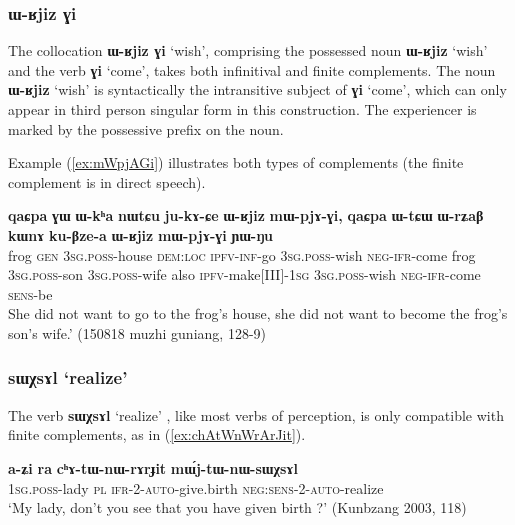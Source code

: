 \documentclass[oneside,a4paper,11pt]{article}
\newcommand{\ipa}[1]{\textbf{\phon#1}} %
\newcommand{\jpg}[2]{\ipa{#1} `#2'} %
\newcommand{\refb}[1]{(\ref{#1})}
\begin{document}
\subsubsection{\ipa{ɯ-ʁjiz ɣi}}
The collocation \jpg{ɯ-ʁjiz ɣi}{wish}, comprising the possessed noun \jpg{ɯ-ʁjiz}{wish} and the verb \jpg{ɣi}{come}, takes both infinitival and finite complements. The noun \jpg{ɯ-ʁjiz}{wish} is syntactically the intransitive subject of \jpg{ɣi}{come}, which can only appear in third person singular form in this construction. The experiencer is marked by the possessive prefix on the noun.

Example \refb{ex:mWpjAGi} illustrates both types of complements (the finite complement is in direct speech).
\begin{exe}
\ex \label{ex:mWpjAGi}
\gll 
\ipa{qaɕpa} 	\ipa{ɣɯ} 	\ipa{ɯ-kʰa} 	\ipa{nɯtɕu} 	\ipa{ju-kɤ-ɕe} 	\ipa{ɯ-ʁjiz} 	\ipa{mɯ-pjɤ-ɣi,} 	\ipa{qaɕpa} 	\ipa{ɯ-tɕɯ} 	\ipa{ɯ-rʑaβ} 	\ipa{kɯnɤ} 	\ipa{ku-βze-a} 	\ipa{ɯ-ʁjiz} 	\ipa{mɯ-pjɤ-ɣi} 	\ipa{ɲɯ-ŋu}  \\
frog \textsc{gen} \textsc{3sg.poss}-house \textsc{dem:loc} \textsc{ipfv-inf}-go \textsc{3sg.poss}-wish \textsc{neg-ifr}-come frog \textsc{3sg.poss}-son \textsc{3sg.poss}-wife also \textsc{ipfv}-make[III]-\textsc{1sg} 
\textsc{3sg.poss}-wish \textsc{neg-ifr}-come \textsc{sens}-be \\
\glt  She did not want to go to the frog's house, she did not want to become the frog's son's wife.' (150818 muzhi guniang, 128-9)
\end{exe}

\subsubsection{\jpg{sɯχsɤl}{realize}}
The verb \jpg{sɯχsɤl}{realize} , like most verbs of perception, is only compatible with finite complements, as in \refb{ex:chAtWnWrArJit}. 

\begin{exe}
\ex \label{ex:chAtWnWrArJit}
\gll \ipa{a-ʑi} 	\ipa{ra} 	\ipa{cʰɤ-tɯ-nɯ-rɤrɟit} 	\ipa{mɯ́j-tɯ-nɯ-sɯχsɤl}\\
\textsc{1sg.poss}-lady \textsc{pl} \textsc{ifr-2-auto}-give.birth \textsc{neg:sens-2-auto}-realize\\
\glt `My lady, don't you see that you have given birth ?' (Kunbzang 2003, 118)
\end{exe}
\end{document}
